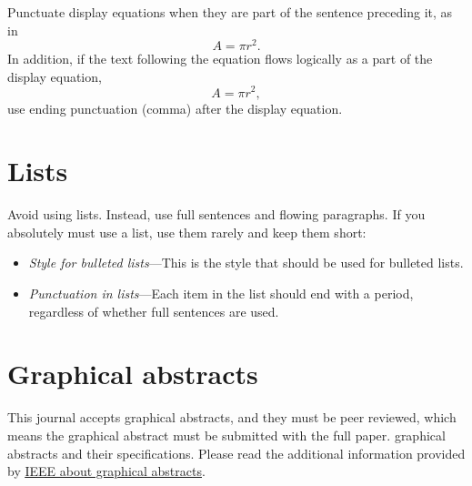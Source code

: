 \documentclass[]{IEEEibm}
\begin{document}
Punctuate display equations when they are part of the sentence preceding it, as in
\begin{equation}
A=\pi r^2.
\end{equation}
In addition, if the text following the equation flows logically as a part of the display equation, 
\begin{equation}
A=\pi r^2,
\end{equation}
use ending punctuation (comma) after the display equation.

\section{Lists}

Avoid using lists. Instead, use full sentences and flowing paragraphs. If you absolutely must use a list, use them rarely and keep them short:
\begin{itemize}
\item {\it Style for bulleted lists}---This is the style that should be used for bulleted lists.
	
\item {\it Punctuation in lists}---Each item in the list should end with a period, regardless of whether full sentences are used.
\end{itemize}

\section{Graphical abstracts}

This journal accepts graphical abstracts, and they must be peer reviewed, which means the graphical abstract must be submitted with the full paper. graphical abstracts and their specifications. Please read the additional information provided by \href{http://www.ieee.org/publications_standards/publications/graphical_abstract.pdf}{\underline{IEEE about graphical abstracts}}.
\end{document}
